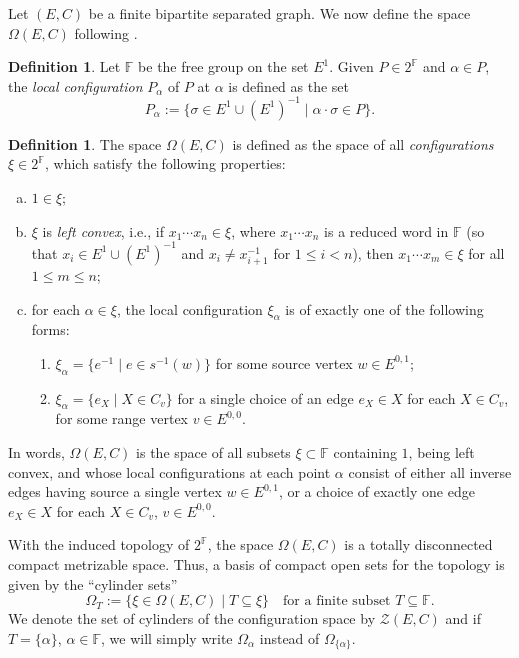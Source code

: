 \documentclass[11pt]{amsart}
\theoremstyle{plain}            %
\theoremstyle{definition}       %
\newtheorem{definition}[theorem]{Definition}
\theoremstyle{definition}       %
\theoremstyle{remark}
\begin{document}
Let $(E,C)$ be a finite bipartite separated graph. We now define the space $\Omega(E,C)$ following \cite[Section 8]{ae14}.

\begin{definition}\label{definition:local_configurations}
	Let $\mathbb{F}$ be the free group on the set $E^1$. Given $P \in 2^{\mathbb{F}}$ and $\alpha \in P$, the \textit{local configuration} $P_{\alpha}$ of $P$ at $\alpha$ is defined as the set
	$$P_{\alpha} := \{ \sigma \in E^1 \cup (E^1)^{-1} \mid \alpha \cdot \sigma \in P\}.$$
\end{definition}

\begin{definition}\label{definition:space_configurations}
	The space $\Omega(E,C)$ is defined as the space of all \textit{configurations} $\xi \in 2^{\mathbb{F}}$, which satisfy the following properties:
	\begin{enumerate}[(a)]
		\item $1 \in \xi$;
		\item $\xi$ is \textit{left convex}, i.e., if $x_1 \cdots x_n \in \xi$, where $x_1 \cdots x_n$ is a reduced word in $\mathbb{F}$ (so that $x_i \in E^1 \cup (E^1)^{-1}$ and $x_i \neq x_{i+1}^{-1}$ for $1 \leq i < n$), then $x_1 \cdots x_m \in \xi$ for all $1 \leq m \leq n$;
		\item for each $\alpha \in \xi$, the local configuration $\xi_{\alpha}$ is of exactly  one of the following forms:
		\begin{enumerate}
			\item[(c.1)] $\xi_{\alpha} = \{e^{-1} \mid e \in s^{-1}(w)\}$ for some source vertex $w \in E^{0,1}$;
			\item[(c.2)] $\xi_{\alpha} = \{e_X \mid X \in C_v\}$ for a single choice of an edge $e_X \in X$ for each $X \in C_v$, for some range vertex $v \in E^{0,0}$.
		\end{enumerate}
	\end{enumerate}
\end{definition}
In words, $\Omega(E,C)$ is the space of all subsets $\xi\subset\mathbb{F}$ containing $1$, being left convex, and whose local configurations at each point $\alpha$ consist of either all inverse edges having source a single vertex $w \in E^{0,1}$, or a choice of exactly one edge $e_X \in X$ for each $X \in C_v$, $v \in E^{0,0}$.

With the induced topology of $2^{\mathbb{F}}$, the space $\Omega(E,C)$ is a totally disconnected compact metrizable space. Thus, a basis of compact open sets for the topology is given by the ``cylinder sets''
$$\Omega_T := \{ \xi \in \Omega(E,C) \mid T \subseteq \xi\} \quad \text{for a finite subset } T\subseteq \mathbb{F} .$$
We denote the set of cylinders of the configuration space by $\mathcal Z (E,C)$ and if $T = \{ \alpha\}$, $\alpha \in \mathbb{F}$, we will simply write $\Omega_{\alpha}$ instead of $\Omega_{\{\alpha\}}$.
\end{document}
